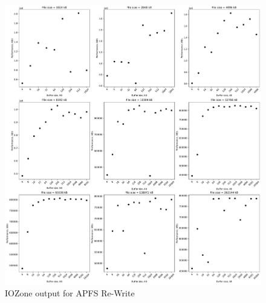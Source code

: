 \begin{figure}[!htb]
	\label{fig:bench_apfs_re_write}
	\begin{center}
		\includegraphics[width=1.0\textwidth]{figures/benchmarking/local/Re-Write.pdf}
	\end{center}
	\caption{IOZone output for \gls{APFS} \mbox{Re-Write}}
\end{figure}

